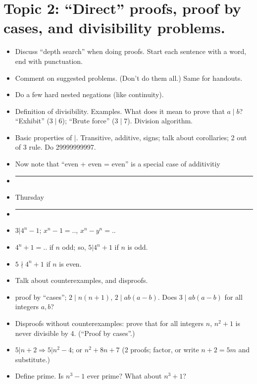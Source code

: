 \documentclass[12pt]{article}
\begin{document}
\newpage
\section[2 (\csname dateWeek2\endcsname): Divisibility problems.]{Topic  2: ``Direct'' proofs, proof by cases, and divisibility problems. }


\begin{itemize}
\item Discuss  ``depth search'' when doing proofs. Start each sentence with a word, end with punctuation. 
\item Comment on suggested problems. (Don't do them all.) Same for handouts.
\item Do a few hard nested negations (like continuity).
\item Definition of divisibility. Examples. What does it mean to prove that $a \mid b$? ``Exhibit'' ($3 \mid 6$); ``Brute force'' ($3 \mid 7$). Division algorithm.
\item Basic properties of $|$. Transitive, additive, signs; talk about corollaries; 2 out of 3 rule. Do 29999999997.
\item Now note that ``even + even = even'' is a special case of additivitiy
\item []       \vspace{0.1cm}\hrule\vspace{-0.4cm}
\item Thursday
\item []       \vspace{0.1cm}\hrule\vspace{-0.4cm}
\item $3 | 4^n-1$; $x^n-1 = ..$, $x^n - y^n = ..$
\item $4^n + 1 = $.. if $n$ odd; so, $5 | 4^n + 1$ if $n$ is odd.
\item $5 \nmid 4^n+1$ if $n$ is even. 
\item Talk about counterexamples, and disproofs.  
  
\item proof by ``cases''; $2 \mid n(n+1)$, $2 \mid ab(a-b)$. Does $3 \mid  ab(a-b)$ for all integers $a,b$?
\item Disproofs without counterexamples: prove that for all integers $n$, $n^2 + 1$ is never divisible by 4. (``Proof by cases''.) 
\item $5 | n+2 \Rightarrow 5 | n^2 - 4$; or $n^2 + 8n + 7$ (2 proofs; factor, or write $n + 2 = 5m$ and substitute.)
\item Define prime. Is $n^3 - 1$ ever prime? What about $n^3 + 1$?
\end{itemize}
\end{document}
